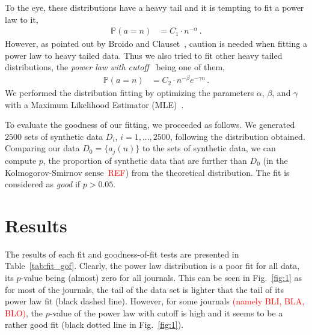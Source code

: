 \documentclass[aps,prl,floatfix,twocolumn]{revtex4-1}
\begin{document}
To the eye, these distributions have a heavy tail and it is tempting to fit a power law to it, 
\begin{align}\label{eq:pl}
 \mathbb{P}(a = n) &= C_1\cdot n^{-\alpha}\, .
\end{align}
However, as pointed out by Broido and Clauset~\cite{Bro18}, caution is needed when fitting a power law to heavy tailed data. 
Thus we also tried to fit other heavy tailed distributions, the \emph{power law with cutoff}~\cite{Bro18} being one of them, 
\begin{align}\label{eq:plco}
 \mathbb{P}(a = n) &= C_2\cdot n^{-\beta}e^{-\gamma n}\, .
\end{align} 
We performed the distribution fitting by optimizing the parameters $\alpha$, $\beta$, and $\gamma$ with a Maximum Likelihood Estimator (MLE)~\cite{Cla09}. 

To evaluate the goodness of our fitting, we proceeded as follows. 
We generated $2500$ sets of synthetic data $D_i$, $i=1,...,2500$, following the distribution obtained. 
Comparing our data $D_0=\{a_j(n)\}$ to the sets of synthetic data, we can compute $p$, the proportion of synthetic data that are further than $D_0$ 
(in the Kolmogorov-Smirnov sense~\textcolor{red}{REF}) from the theoretical distribution. 
The fit is considered as \emph{good} if $p>0.05$. 


\section{Results}
The results of each fit and goodness-of-fit tests are presented in Table~\ref{tab:fit_gof}. 
Clearly, the power law distribution is a poor fit for all data, its $p$-value being (almost) zero for all journals. 
This can be seen in Fig.~\ref{fig:1} as for most of the journals, the tail of the data set is lighter that the tail of its power law fit (black dashed line). 
However, for some journals \textcolor{red}{(namely BLI, BLA, BLO)}, the $p$-value of the power law with cutoff is high and it seems to be a rather good fit (black dotted line in Fig.~\ref{fig:1}). 
\end{document}

